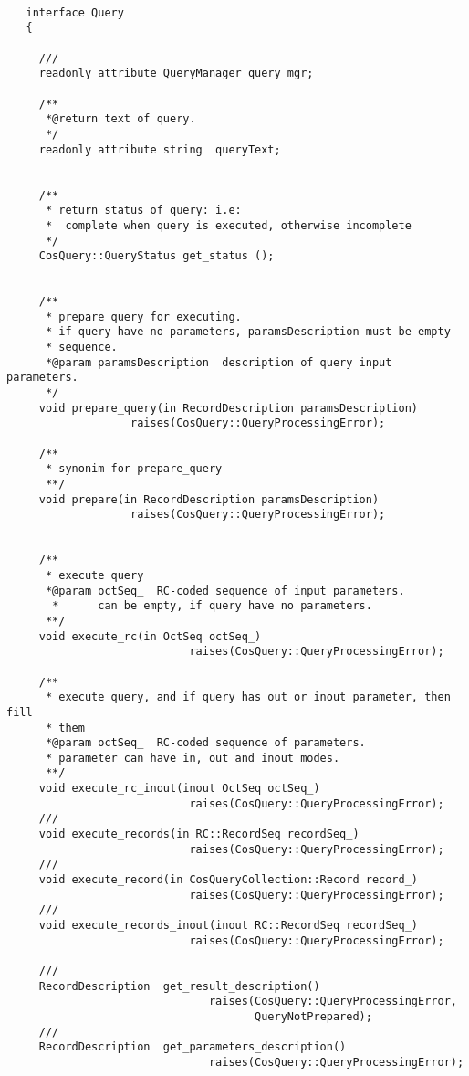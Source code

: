 \documentclass[10pt]{article}
\begin{document}
\begin{verbatim}

   interface Query
   {

     ///
     readonly attribute QueryManager query_mgr;

     /**
      *@return text of query.
      */
     readonly attribute string  queryText;
 

     /**
      * return status of query: i.e: 
      *  complete when query is executed, otherwise incomplete
      */
     CosQuery::QueryStatus get_status ();


     /**
      * prepare query for executing.
      * if query have no parameters, paramsDescription must be empty 
      * sequence.
      *@param paramsDescription  description of query input parameters.
      */
     void prepare_query(in RecordDescription paramsDescription)
                   raises(CosQuery::QueryProcessingError);

     /**
      * synonim for prepare_query 
      **/
     void prepare(in RecordDescription paramsDescription)
                   raises(CosQuery::QueryProcessingError);


     /**
      * execute query
      *@param octSeq_  RC-coded sequence of input parameters.
       *      can be empty, if query have no parameters.
      **/
     void execute_rc(in OctSeq octSeq_)
                            raises(CosQuery::QueryProcessingError);

     /**
      * execute query, and if query has out or inout parameter, then fill
      * them
      *@param octSeq_  RC-coded sequence of parameters.
      * parameter can have in, out and inout modes.
      **/
     void execute_rc_inout(inout OctSeq octSeq_)
                            raises(CosQuery::QueryProcessingError);
     /// 
     void execute_records(in RC::RecordSeq recordSeq_)
                            raises(CosQuery::QueryProcessingError);
     ///
     void execute_record(in CosQueryCollection::Record record_)
                            raises(CosQuery::QueryProcessingError);
     ///
     void execute_records_inout(inout RC::RecordSeq recordSeq_)
                            raises(CosQuery::QueryProcessingError);
     
     ///
     RecordDescription  get_result_description() 
                               raises(CosQuery::QueryProcessingError, 
                                      QueryNotPrepared);
     ///
     RecordDescription  get_parameters_description()
                               raises(CosQuery::QueryProcessingError);


\end{verbatim}
\end{document}

